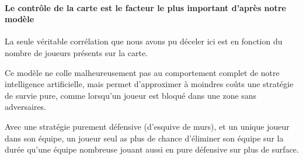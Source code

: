 \paragraph{Le contrôle de la carte est le facteur le plus important d'après notre modèle}
La seule véritable corrélation que nous avons pu déceler ici est en fonction du nombre de joueurs présents sur la carte.

Ce modèle ne colle malheureusement pas au comportement complet de notre intelligence artificielle, mais permet d'approximer à moindres coûts une stratégie de survie pure, comme lorsqu'un joueur est bloqué dans une zone sans adversaires.

\begin{result}
	Avec une stratégie purement défensive (d'esquive de murs), et un unique joueur dans son équipe, un joueur seul as plus de chance d'éliminer son équipe sur la durée qu'une équipe nombreuse jouant aussi en pure défensive sur plus de surface.
\end{result}

